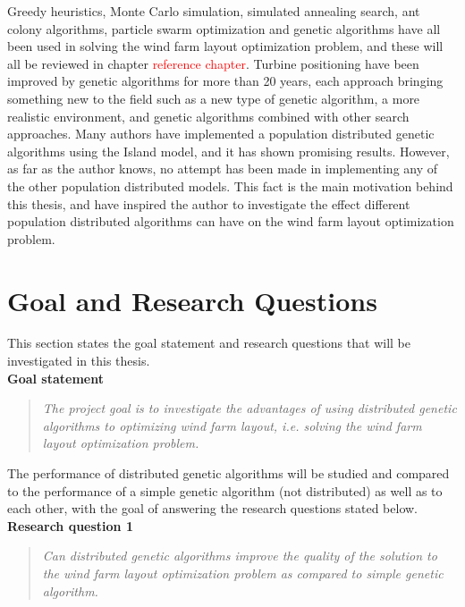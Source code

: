 \noindent Greedy heuristics, Monte Carlo simulation, simulated annealing search, ant colony algorithms, particle swarm optimization and genetic algorithms have all been used in solving the wind farm layout optimization problem, and these will all be reviewed in chapter \textcolor{red}{reference chapter}. Turbine positioning have been improved by genetic algorithms for more than 20 years, each approach bringing something new to the field such as a new type of genetic algorithm, a more realistic environment, and genetic algorithms combined with other search approaches. Many authors have implemented a population distributed genetic algorithms using the Island model, and it has shown promising results. However, as far as the author knows, no attempt has been made in implementing any of the other population distributed models. This fact is the main motivation behind this thesis, and have inspired the author to investigate the effect different population distributed algorithms can have on the wind farm layout optimization problem. 


\section{Goal and Research Questions}
This section states the goal statement and research questions that will be investigated in this thesis. \\

\noindent \textbf{Goal statement}

\begin{quote}
\textit{The project goal is to investigate the advantages of using distributed genetic algorithms to optimizing wind farm layout, i.e. solving the wind farm layout optimization problem.} \citep{Samorani}
\end{quote}

\noindent The performance of distributed genetic algorithms will be studied and compared to the performance of a simple genetic algorithm (not distributed) as well as to each other, with the goal of answering the research questions stated below.\\

\noindent \textbf{Research question 1}

\begin{quote}
\textit{Can distributed genetic algorithms improve the quality of the solution to the wind farm layout optimization problem as compared to simple genetic algorithm.}
\end{quote}

